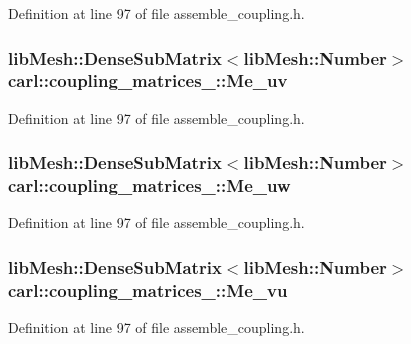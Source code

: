 Definition at line 97 of file assemble\+\_\+coupling.\+h.

\hypertarget{classcarl_1_1coupling__matrices__3_a4ce35a3abfdcfa68633df7a7f1f685e0}{}
\subsubsection[{Me\+\_\+uv}]{\setlength{\rightskip}{0pt plus 5cm}lib\+Mesh\+::\+Dense\+Sub\+Matrix$<$lib\+Mesh\+::\+Number$>$ carl\+::coupling\+\_\+matrices\+\_\+::\+Me\+\_\+uv}\label{classcarl_1_1coupling__matrices__3_a4ce35a3abfdcfa68633df7a7f1f685e0}


Definition at line 97 of file assemble\+\_\+coupling.\+h.

\hypertarget{classcarl_1_1coupling__matrices__3_a11eb52d03c2c0520f87c75a89ed4d049}{}
\subsubsection[{Me\+\_\+uw}]{\setlength{\rightskip}{0pt plus 5cm}lib\+Mesh\+::\+Dense\+Sub\+Matrix$<$lib\+Mesh\+::\+Number$>$ carl\+::coupling\+\_\+matrices\+\_\+::\+Me\+\_\+uw}\label{classcarl_1_1coupling__matrices__3_a11eb52d03c2c0520f87c75a89ed4d049}


Definition at line 97 of file assemble\+\_\+coupling.\+h.

\hypertarget{classcarl_1_1coupling__matrices__3_a7f606b964255ab6db7df26647ca7676c}{}
\subsubsection[{Me\+\_\+vu}]{\setlength{\rightskip}{0pt plus 5cm}lib\+Mesh\+::\+Dense\+Sub\+Matrix$<$lib\+Mesh\+::\+Number$>$ carl\+::coupling\+\_\+matrices\+\_\+::\+Me\+\_\+vu}\label{classcarl_1_1coupling__matrices__3_a7f606b964255ab6db7df26647ca7676c}


Definition at line 97 of file assemble\+\_\+coupling.\+h.

